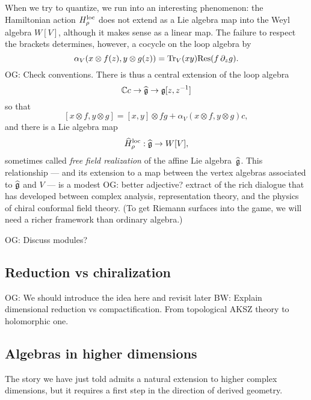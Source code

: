 \documentclass[11pt]{amsart}
\def\brian#1{{\textcolor{blue!65!red}{BW: {#1}}}}
\def\owen#1{{\textcolor{violet!65!black}{OG: {#1}}}}
\begin{document}
When we try to quantize, we run into an interesting phenomenon:
the Hamiltonian action $H_\rho^{\rm loc}$ does not extend as a Lie algebra map into the Weyl algebra $W[V]$,
although it makes sense as a linear map.
The failure to respect the brackets determines, however, a cocycle on the loop algebra
by
\[
\alpha_V( x \otimes f(z) , y \otimes g(z)) = {\rm Tr}_V(xy) {\rm Res}(f \, \partial_z g).
\]
\owen{Check conventions.}
There is thus a central extension of the loop algebra 
\[
\mathbb C c \to \widehat{\mathfrak g} \to \mathfrak g[z,z^{-1}]
\]
so that 
\[
[x \otimes f, y \otimes g] = [x,y] \otimes fg + \alpha_V( x \otimes f , y \otimes g) c,
\]
and there is a Lie algebra map
\[
\widehat{H}^{\rm loc}_\rho: \widehat{\mathfrak g} \to W[V],
\]
sometimes called {\em free field realization} of the affine Lie algebra~$\widehat{\mathfrak g}$.
This relationship --- and its extension to a map between the vertex algebras associated to $\widehat{\mathfrak g}$ and $V$ --- is a modest \owen{better adjective?} extract of the rich dialogue that has developed between complex analysis, representation theory, and the physics of chiral conformal field theory.
(To get Riemann surfaces into the game, we will need a richer framework than ordinary algebra.)

\owen{Discuss modules?}

\subsection{Reduction vs chiralization}

\owen{We should introduce the idea here and revisit later}
\brian{Explain dimensional reduction vs compactification.
From topological AKSZ theory to holomorphic one.}

\subsection{Algebras in higher dimensions }

The story we have just told admits a natural extension to higher complex dimensions,
but it requires a first step in the direction of derived geometry.
\end{document}
